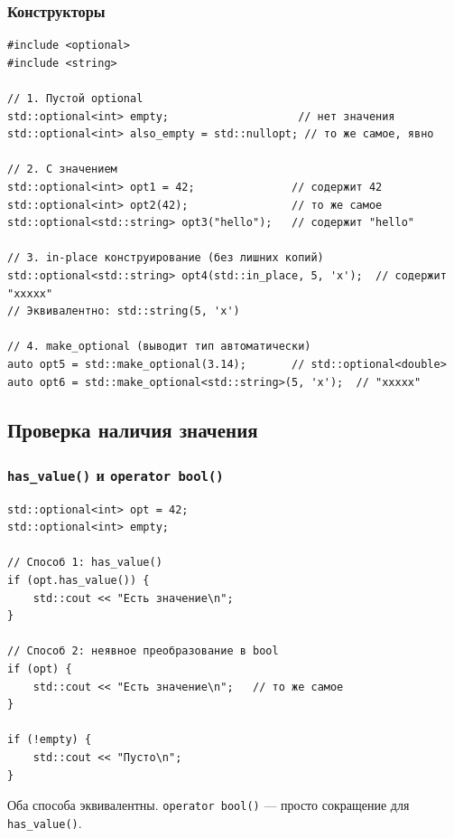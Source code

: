 \documentclass[a4paper,12pt]{article}
\begin{document}
\subsubsection{Конструкторы}

\begin{lstlisting}
#include <optional>
#include <string>

// 1. Пустой optional
std::optional<int> empty;                    // нет значения
std::optional<int> also_empty = std::nullopt; // то же самое, явно

// 2. С значением
std::optional<int> opt1 = 42;               // содержит 42
std::optional<int> opt2(42);                // то же самое
std::optional<std::string> opt3("hello");   // содержит "hello"

// 3. in-place конструирование (без лишних копий)
std::optional<std::string> opt4(std::in_place, 5, 'x');  // содержит "xxxxx"
// Эквивалентно: std::string(5, 'x')

// 4. make_optional (выводит тип автоматически)
auto opt5 = std::make_optional(3.14);       // std::optional<double>
auto opt6 = std::make_optional<std::string>(5, 'x');  // "xxxxx"
\end{lstlisting}

\subsection{Проверка наличия значения}

\subsubsection{\texttt{has\_value()} и \texttt{operator bool()}}

\begin{lstlisting}
std::optional<int> opt = 42;
std::optional<int> empty;

// Способ 1: has_value()
if (opt.has_value()) {
    std::cout << "Есть значение\n";
}

// Способ 2: неявное преобразование в bool
if (opt) {
    std::cout << "Есть значение\n";   // то же самое
}

if (!empty) {
    std::cout << "Пусто\n";
}
\end{lstlisting}

Оба способа эквивалентны. \texttt{operator bool()} --- просто сокращение
для \texttt{has\_value()}.

\end{document}
